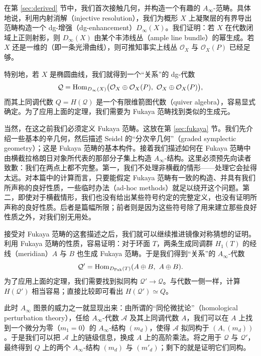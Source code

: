 在第 \ref{sec:derived} 节中，我们首次接触几何，并构造一个有趣的 $A_\infty$-范畴。具体地说，利用内射消解（injective resolution），我们为概形 $X$ 上凝聚层的有界导出范畴构造一个 dg-增强（dg-enhancement）$D_\infty(X)$。我们证明：若 $X$ 在代数闭域上正则射影，则 $D_\infty(X)$ 由某个丰沛线丛（ample line bundle）的幂生成。若 $X$ 还是一维的（即一条光滑曲线），则可推知事实上线丛 $\mathcal{O}_X$ 与 $\mathcal{O}_X(P)$ 已经足够。

特别地，若 $X$ 是椭圆曲线，我们就得到一个“关系”的 dg-代数
\[
  \mathcal{Q} = \Hom_{D_\infty(X)}\bigl(\mathcal{O}_X\oplus\mathcal{O}_X(P),\ \mathcal{O}_X\oplus\mathcal{O}_X(P)\bigr),
\]
而其上同调代数 $Q = H(\mathcal{Q})$ 是一个有限维箭图代数（quiver algebra），容易显式确定。为了应用上面的定理，我们需要为 Fukaya 范畴找到类似的生成元。

当然，在这之前我们必须定义 Fukaya 范畴。这放在第 \ref{sec:fukaya} 节。我们先介绍一些基本的辛几何，然后描述 Seidel 的“分次辛几何”（graded symplectic geometry）；这是 Fukaya 范畴的基本构件。接着我们描述如何在 Fukaya 范畴中由横截拉格朗日对象所代表的那部分子集上构造 $A_\infty$-结构。这里必须预先向读者致歉：我们在两点上都不完整。第一，我们不处理非横截的情形——处理它会扯得太远。对本篇中的计算而言，只要能假定 Fukaya 范畴有一致的构造、并具有我们所声称的良好性质，一些临时办法（ad-hoc methods）就足以绕开这个问题。第二，即使对于横截情形，我们也没有给出某些符号约定的完整定义，也没有证明所声称的良好性质。后者是篇幅所限；前者则是因为这些符号除了用来建立那些良好性质之外，对我们别无用处。

接受对 Fukaya 范畴的这套描述之后，我们就可以继续推进镜像对称猜想的证明。利用 Fukaya 范畴的性质，容易证明：对于环面 $T$，两条生成同调群 $H_1(T)$ 的经线（meridian）$A$ 与 $B$ 也生成 Fukaya 范畴。于是我们得到“关系”的 $A_\infty$-代数
\[
  \mathcal{Q}' = \operatorname{Hom}_{D_{\operatorname{Fuk}}(T)}(A\oplus B,\ A\oplus B).
\]
为了应用上面的定理，我们需要找到拟同构 $\mathcal{Q}'\to\mathcal{Q}$。与代数一侧一样，计算 $H(\mathcal{Q}')$ 相当容易；直接比较即可看出 $H(\mathcal{Q}')\simeq Q$。


此时 $A_\infty$ 图景的威力之一就显现出来：由所谓的“同伦微扰论”（homological perturbation theory），任给 $A_\infty$-代数 $\mathcal{A}$ 及其上同调代数 $A$，我们可以在 $A$ 上找到一个微分为零（$m_1=0$）的 $A_\infty$-结构 $(m_d)$，使得 $\mathcal{A}$ 拟同构于 $(A,(m_d))$。于是我们可以把 $\mathcal{A}$ 上的链级信息，换成 $A$ 上的高阶乘法。将之用于 $\mathcal{Q}$ 与 $\mathcal{Q}'$，最终得到 $Q$ 上的两个 $A_\infty$-结构 $(m_d)$ 与 $(m'_d)$；剩下的就是证明它们同构。

